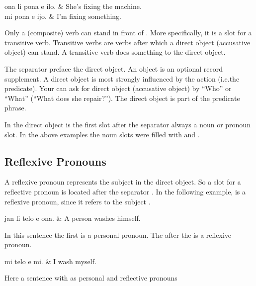 \begin{translationtable}
    ona li pona e ilo. & She's fixing the machine. \\
    mi pona e ijo.     & I'm fixing something.     \\
\end{translationtable}
%
Only a (composite) verb can stand in front of .
More specifically, it is a slot for a transitive verb.
Transitive verbs are verbs after which a direct object (accusative object) can stand.
A transitive verb does something to the direct object.

The separator  preface the direct object.
An object is an optional record supplement.
A direct object is most strongly influenced by the action (i.e.\@ the predicate).
Your can ask for direct object (accusative object) by ``Who'' or ``What'' (``What does she repair?'').
The direct object is part of the predicate phrase.

In the direct object is the first slot after the separator  always a noun or pronoun slot.
In the above examples the noun slots were filled with  and .

\subsection*{Reflexive Pronouns}
A reflexive pronoun represents the subject in the direct object.
So a slot for a reflective pronoun is located after the separator .
In the following example,  is a reflexive pronoun, since it refers to the subject .

\begin{translationtable}
    jan li telo e ona. & A person washes himself. \\
\end{translationtable}
%
In this sentence the first  is a personal pronoun.
The  after the  is a reflexive pronoun.

\begin{translationtable}
    mi telo e mi. & I wash myself. \\
\end{translationtable}
%
Here a sentence with  as personal and reflective pronouns

